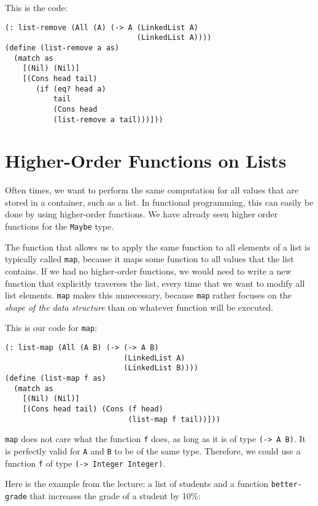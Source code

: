 \documentclass{article}
\begin{document}
\vspace{1cm}

This is the code:

\begin{lstlisting}
(: list-remove (All (A) (-> A (LinkedList A)
                              (LinkedList A))))
(define (list-remove a as)
  (match as
    [(Nil) (Nil)]
    [(Cons head tail)
       (if (eq? head a)
           tail
           (Cons head
           (list-remove a tail)))]))
\end{lstlisting}

\section{Higher-Order Functions on Lists}

Often times, we want to perform the same computation for all values that are stored in a container, such as a list. In functional programming, this can easily be done by using higher-order functions. We have already seen higher order functions for the \lstinline{Maybe} type.

The function that allows us to apply the same function to all elements of a list is typically called \lstinline{map}, because it maps some function to all values that the list contains. If we had no higher-order functions, we would need to write a new function that explicitly traverses the list, every time that we want to modify all list elements. \lstinline{map} makes this unnecessary, because \lstinline{map} rather focuses on the \emph{shape of the data structure} than on whatever function will be executed.

This is our code for \lstinline{map}:

\begin{lstlisting}
(: list-map (All (A B) (-> (-> A B)
                           (LinkedList A)
                           (LinkedList B))))
(define (list-map f as)
  (match as
    [(Nil) (Nil)]
    [(Cons head tail) (Cons (f head)
                            (list-map f tail))]))
\end{lstlisting}

\lstinline{map} does not care what the function \lstinline{f} does, as long as it is of type \lstinline{(-> A B)}. It is perfectly valid for \lstinline{A} and \lstinline{B} to be of the same type. Therefore, we could use a function \lstinline{f} of type \lstinline{(-> Integer Integer)}.

Here is the example from the lecture: a list of students and a function \lstinline{better-grade} that increases the grade of a student by 10\%:
\end{document}
